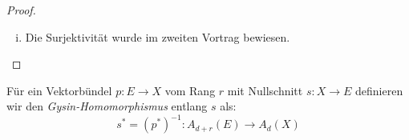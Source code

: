 \documentclass[10pt,a4paper]{article}
\begin{document}
\begin{proof}
\begin{enumerate}[(i)]
\item Die Surjektivität wurde im zweiten Vortrag bewiesen.
\end{enumerate}
\end{proof}

\begin{definition}
Für ein Vektorbündel $p:E\to X$ vom Rang $r$ mit Nullschnitt $s:X\to E$ definieren wir den \textit{Gysin-Homomorphismus} entlang $s$ als:
\[ s^\ast = (p^\ast)^{-1}: A_{d+r}(E)\to A_d(X) \]
\end{definition}
\end{document}
